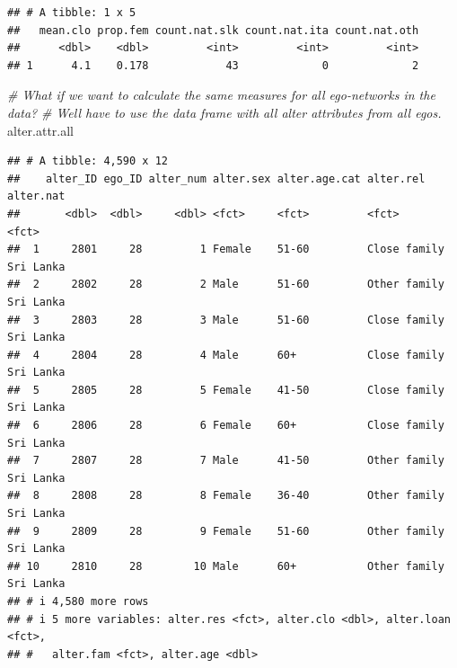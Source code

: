 \documentclass[
]{book}
\newenvironment{Shaded}{\begin{snugshade}}{\end{snugshade}}
\newcommand{\CommentTok}[1]{\textcolor[rgb]{0.56,0.35,0.01}{\textit{#1}}}
\newcommand{\NormalTok}[1]{#1}
\begin{document}
\begin{verbatim}
## # A tibble: 1 x 5
##   mean.clo prop.fem count.nat.slk count.nat.ita count.nat.oth
##      <dbl>    <dbl>         <int>         <int>         <int>
## 1      4.1    0.178            43             0             2
\end{verbatim}

\begin{Shaded}
\begin{Highlighting}[]
\CommentTok{\# What if we want to calculate the same measures for all ego{-}networks in the data?}
\CommentTok{\# We\textquotesingle{}ll have to use the data frame with all alter attributes from all egos.}
\NormalTok{alter.attr.all}
\end{Highlighting}
\end{Shaded}

\begin{verbatim}
## # A tibble: 4,590 x 12
##    alter_ID ego_ID alter_num alter.sex alter.age.cat alter.rel    alter.nat
##       <dbl>  <dbl>     <dbl> <fct>     <fct>         <fct>        <fct>    
##  1     2801     28         1 Female    51-60         Close family Sri Lanka
##  2     2802     28         2 Male      51-60         Other family Sri Lanka
##  3     2803     28         3 Male      51-60         Close family Sri Lanka
##  4     2804     28         4 Male      60+           Close family Sri Lanka
##  5     2805     28         5 Female    41-50         Close family Sri Lanka
##  6     2806     28         6 Female    60+           Close family Sri Lanka
##  7     2807     28         7 Male      41-50         Other family Sri Lanka
##  8     2808     28         8 Female    36-40         Other family Sri Lanka
##  9     2809     28         9 Female    51-60         Other family Sri Lanka
## 10     2810     28        10 Male      60+           Other family Sri Lanka
## # i 4,580 more rows
## # i 5 more variables: alter.res <fct>, alter.clo <dbl>, alter.loan <fct>,
## #   alter.fam <fct>, alter.age <dbl>
\end{verbatim}
\end{document}
